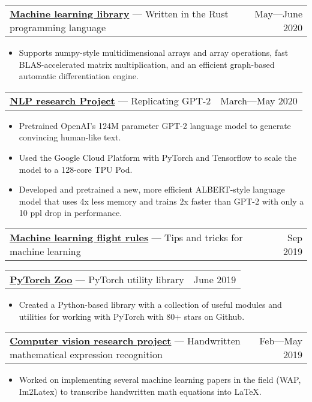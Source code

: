 \documentclass[letterpaper,11pt]{article}
\makeatletter
\newcommand{\heading}[3]{
    \begin{tabular*}{\textwidth}{l@{\extracolsep{\fill}}r}
        \textbf{#1} — #2 & #3
    \end{tabular*}
    \vspace{-1em}
}
\newcommand{\items}[1]{
    \begin{itemize}[topsep=0pt,leftmargin=1em]\itemsep0em
        #1
    \end{itemize}
}
\makeatother
\begin{document}
    \vspace{5pt}

    \heading{\href{https://github.com/bkkaggle/L2}{Machine learning library}}{Written in the Rust programming language}{May—June 2020}
    \items{
        \item Supports numpy-style multidimensional arrays and array operations, fast BLAS-accelerated matrix multiplication, and an efficient graph-based automatic differentiation engine.
    }
    
    \vspace{5pt}

    \heading{\href{https://github.com/bkkaggle/lm-training-research-project}{NLP research Project}}{Replicating GPT-2}{March—May 2020}
    \items{
        \item Pretrained OpenAI's 124M parameter GPT-2 language model to generate convincing human-like text.
        \item Used the Google Cloud Platform with PyTorch and Tensorflow to scale the model to a 128-core TPU Pod. 
        \item Developed and pretrained a new, more efficient ALBERT-style language model that uses 4x less memory and trains 2x faster than GPT-2 with only a 10 ppl drop in performance.
    }

    \vspace{5pt}

    \heading{\href{https://github.com/bkkaggle/machine-learning-flight-rules}{Machine learning flight rules}}{Tips and tricks for machine learning}{Sep 2019}

    \vspace{5pt}

    \heading{\href{https://github.com/bkkaggle/pytorch_zoo}{PyTorch Zoo}}{PyTorch utility library}{June 2019}
    \items{
        \item Created a Python-based library with a collection of useful modules and utilities for working with PyTorch with 80+ stars on Github.
    }

    \vspace{5pt}

    \heading{\href{https://github.com/bkkaggle/math-recognition}{Computer vision research project}}{Handwritten mathematical expression recognition}{Feb—May 2019}
    \items{
        \item Worked on implementing several machine learning papers in the field (WAP, Im2Latex) to transcribe handwritten math equations into LaTeX.
    }
\end{document}
